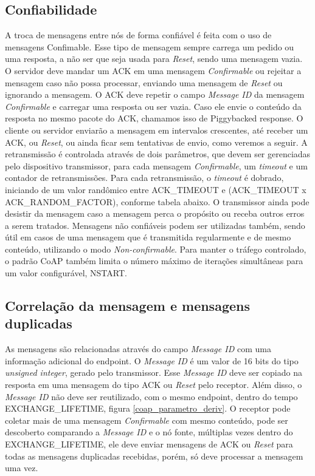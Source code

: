\subsection{Confiabilidade}

A troca de mensagens entre nós de forma confiável é feita com o uso de mensagens Confimable. Esse tipo de mensagem sempre carrega um pedido ou uma resposta, a não ser que seja usada para \textit{Reset}, sendo uma mensagem vazia.
O servidor deve mandar um ACK em uma mensagem \textit{Confirmable} ou rejeitar a mensagem caso não possa processar, enviando uma mensagem de \textit{Reset} ou ignorando a mensagem. O ACK deve repetir o campo \textit{Message ID} da mensagem \textit{Confirmable} e carregar uma resposta ou ser vazia.  Caso ele envie o conteúdo da resposta no mesmo pacote do ACK, chamamos isso de Piggybacked response.
O cliente ou servidor enviarão a mensagem em intervalos crescentes, até receber um ACK, ou \textit{Reset}, ou ainda ficar sem tentativas de envio, como veremos a seguir.
A retransmissão é controlada através de dois parâmetros, que devem ser gerenciadas pelo dispositivo transmissor, para cada mensagem \textit{Confirmable}, um \textit{timeout} e um contador de retransmissões. Para cada retransmissão, o \textit{timeout} é dobrado, iniciando de um valor randômico entre ACK\_TIMEOUT e (ACK\_TIMEOUT x ACK\_RANDOM\_FACTOR), conforme tabela abaixo. O transmissor ainda pode desistir da mensagem caso a mensagem perca o propósito ou receba outros erros a serem tratados.
Mensagens não confiáveis podem ser utilizadas também, sendo útil em casos de uma mensagem que é transmitida regularmente e de mesmo conteúdo, utilizando o modo \textit{\textit{Non-confirmable}}.
Para manter o tráfego controlado, o padrão CoAP também limita o número máximo de iterações simultâneas para um valor configurável, NSTART.


\subsection{Correlação da mensagem e mensagens duplicadas}

As mensagens são relacionadas através do campo \textit{Message ID} com uma informação adicional do endpoint. O \textit{Message ID} é um valor de 16 bits do tipo \textit{unsigned integer}, gerado pelo transmissor. Esse \textit{Message ID} deve ser copiado na resposta em uma mensagem do tipo ACK ou \textit{Reset} pelo receptor. Além disso, o \textit{Message ID} não deve ser reutilizado, com o mesmo endpoint, dentro do tempo EXCHANGE\_LIFETIME, figura \ref{coap_parametro_deriv}.
O receptor pode coletar mais de uma mensagem \textit{Confirmable} com mesmo conteúdo, pode ser descoberto comparando a \textit{Message ID} e o nó fonte, múltiplas vezes dentro do EXCHANGE\_LIFETIME, ele deve enviar mensagens de ACK ou \textit{Reset} para todas as mensagens duplicadas recebidas, porém, só deve processar a mensagem uma vez.


